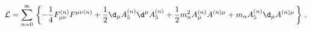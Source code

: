 \begin{equation}
\mathcal{L} = \sum_{n=0}^{\infty} \, \left\{-\frac{1}{4} F_{\mu\nu}^{(n)}
F^{\mu\nu(n)} + \frac{1}{2} \d_\mu A_5^{(n)} \d^\mu A_5^{(n)}
+ \frac{1}{2} m_n^2 A_\mu^{(n)} A^{(n)\mu} + m_n A_5^{(n)} \d_\mu
A^{(n)\mu} \, \right\} \, .
\label{simpleaction}
\end{equation}

